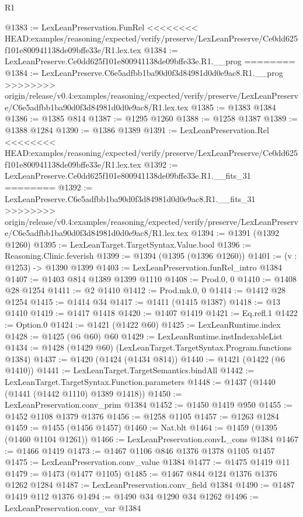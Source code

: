 \begin{lexlean}{R1}
\begin{coremodule}
{{{{{{{{{{{{{{{{{{{{{{{{{{{{{{{{{{{{{{{{{{{{{{{{{{{{{{{{{{{{{{{{{{{{{{{{{{{{{{{{{{{{{{{{{{@1383 := LexLeanPreservation.FunRel
<<<<<<<< HEAD:examples/reasoning/expected/verify/preserve/LexLeanPreserve/Ce0dd625f101e800941138de09bffe33e/R1.lex.tex
@1384 := LexLeanPreserve.Ce0dd625f101e800941138de09bffe33e.R1.__prog
========
@1384 := LexLeanPreserve.C6e5adfbb1ba90d0f3d84981d0d0e9ac8.R1.__prog
>>>>>>>> origin/release/v0.4:examples/reasoning/expected/verify/preserve/LexLeanPreserve/C6e5adfbb1ba90d0f3d84981d0d0e9ac8/R1.lex.tex
@1385 := @1383 @1384
@1386 := @1385 @814
@1387 := @1295 @1260
@1388 := @1258 @1387
@1389 := @1388 @1284
@1390 := @1386 @1389
@1391 := LexLeanPreservation.Rel
<<<<<<<< HEAD:examples/reasoning/expected/verify/preserve/LexLeanPreserve/Ce0dd625f101e800941138de09bffe33e/R1.lex.tex
@1392 := LexLeanPreserve.Ce0dd625f101e800941138de09bffe33e.R1.__fits_31
========
@1392 := LexLeanPreserve.C6e5adfbb1ba90d0f3d84981d0d0e9ac8.R1.__fits_31
>>>>>>>> origin/release/v0.4:examples/reasoning/expected/verify/preserve/LexLeanPreserve/C6e5adfbb1ba90d0f3d84981d0d0e9ac8/R1.lex.tex
@1394 := @1391 (@1392 @1260)
@1395 := LexLeanTarget.TargetSyntax.Value.bool
@1396 := Reasoning.Clinic.feverish
@1399 := @1394 (@1395 (@1396 @1260))
@1401 := (v : @1253) -> @1390 @1399
@1403 := LexLeanPreservation.funRel_intro @1384
@1407 := @1403 @814 @1389 @1399 @1110
@1408 := Prod.{0, 0}
@1410 := @1408 @28 @1254
@1411 := @2 @1410
@1412 := Prod.mk.{0, 0}
@1414 := @1412 @28 @1254
@1415 := @1414 @34
@1417 := @1411 (@1415 @1387)
@1418 := @13 @1410
@1419 := @1417 @1418
@1420 := @1407 @1419
@1421 := Eq.refl.{1}
@1422 := Option.{0}
@1424 := @1421 (@1422 @60)
@1425 := LexLeanRuntime.index
@1428 := @1425 (@6 @60) @60
@1429 := LexLeanRuntime.instIndexableList
@1434 := @1428 (@1429 @60) (LexLeanTarget.TargetSyntax.Program.functions @1384)
@1437 := @1420 (@1424 (@1434 @814))
@1440 := @1421 (@1422 (@6 @1410))
@1441 := LexLeanTarget.TargetSemantics.bindAll
@1442 := LexLeanTarget.TargetSyntax.Function.parameters
@1448 := @1437 (@1440 (@1441 (@1442 @1110) @1389 @1418))
@1450 := LexLeanPreservation.conv_prim @1384
@1452 := @1450 @1419 @950
@1455 := @1452 @1108 @1379 @1376
@1456 := @1258 @1105
@1457 := @1263 @1284
@1459 := @1455 (@1456 @1457)
@1460 := Nat.blt
@1464 := @1459 (@1395 (@1460 @1104 @1261))
@1466 := LexLeanPreservation.convL_cons @1384
@1467 := @1466 @1419
@1473 := @1467 @1106 @846 @1376 @1378 @1105 @1457
@1475 := LexLeanPreservation.conv_value @1384
@1477 := @1475 @1419 @11
@1479 := @1473 (@1477 @1105)
@1485 := @1467 @844 @124 @1376 @1376 @1262 @1284
@1487 := LexLeanPreservation.conv_field @1384
@1490 := @1487 @1419 @112 @1376
@1494 := @1490 @34 @1290 @34 @1262
@1496 := LexLeanPreservation.conv_var @1384
}}}}}}}}}}}}}}}}}}}}}}}}}}}}}}}}}}}}}}}}}}}}}}}}}}}}}}}}}}}}}}}}}}}}}}}}}}}}}}}}}}}}}}}}}}
\end{coremodule}
\end{lexlean}
